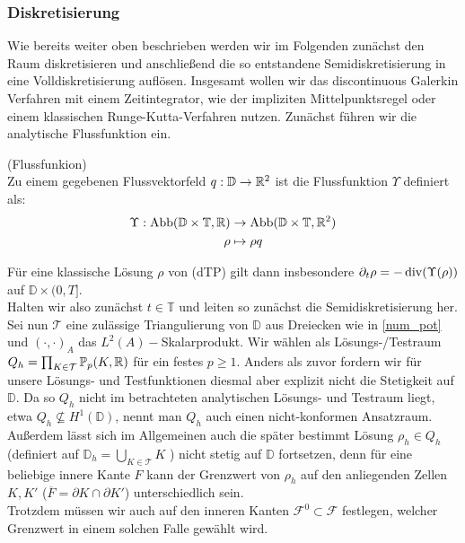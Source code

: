 \subsubsection{Diskretisierung}
Wie bereits weiter oben beschrieben werden wir im Folgenden zunächst den Raum diskretisieren und anschließend die so entstandene Semidiskretisierung in eine Volldiskretisierung auflösen. Insgesamt wollen wir das discontinuous Galerkin Verfahren mit einem Zeitintegrator, wie der impliziten Mittelpunktsregel oder einem klassischen Runge-Kutta-Verfahren nutzen. Zunächst führen wir die analytische Flussfunktion ein. 
\begin{Definition}(Flussfunkion) \\
	\label{Flussfunktion}
	Zu einem gegebenen Flussvektorfeld $ q : \mathbb{D} \to \mathbb{R}^2 $ ist die Flussfunktion $ \Upsilon$ definiert als:\\
	\begin{align*}
		 \Upsilon : \text{Abb}(\mathbb{D}\times\mathbb{T},\mathbb{R}) &\to \text{Abb}(\mathbb{D}\times\mathbb{T},\mathbb{R}^2) \\
		 \rho &\mapsto \rho q
	\end{align*}
\end{Definition}
Für eine klassische Lösung $ \rho  $ von (dTP) gilt dann insbesondere $ \partial_t \rho = - \operatorname{div} (\Upsilon(\rho)) $ auf $ \mathbb{D} \times (0,T] $.	\\
Halten wir also zunächst $ t \in \mathbb{T} $ und leiten so zunächst die Semidiskretisierung her.\\
Sei nun $ \mathcal{T} $ eine zulässige Triangulierung von $ \mathbb{D} $ aus Dreiecken wie in \ref{num_pot} und  $ (\cdot , \cdot)_A $ das $ L^2(A)-$Skalarprodukt.
Wir wählen als Lösungs-/Testraum $Q_h = \prod_{K \in \mathcal{T}} \mathbb{P}_p(K,\mathbb{R}) $ für ein festes $p \geq 1 $. Anders als zuvor fordern wir für unsere Lösungs- und Testfunktionen diesmal aber explizit nicht die Stetigkeit auf $\mathbb{D}$. Da so $Q_h$ nicht im betrachteten analytischen Lösungs- und Testraum liegt, etwa  $Q_h \nsubseteq H^1(\mathbb{D})$, nennt man $Q_h$ auch einen nicht-konformen Ansatzraum.
Außerdem lässt sich im Allgemeinen auch die später bestimmt Lösung $ \rho_h \in Q_h $ (definiert auf $\mathbb{D}_h = \bigcup_{K \in \mathcal{T}} K$ ) nicht stetig auf $ \mathbb{D} $ fortsetzen, denn für eine beliebige innere Kante $ F $ kann der Grenzwert von $ \rho_h $ auf den anliegenden Zellen $ K,K' $ ($ \overline{F} = \partial K \cap \partial K' $) unterschiedlich sein. \\
Trotzdem müssen wir auch auf den inneren Kanten $ \mathcal{F}^0 \subset \mathcal{F} $ festlegen, welcher Grenzwert in einem solchen Falle gewählt wird. \\
